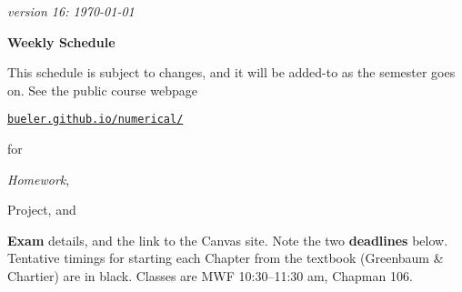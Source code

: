 \documentclass[12pt]{article}
\newcommand{\due}[1]{\strut {\color{BrickRed} \textsl{#1}}}
\newcommand{\proj}[1]{\strut {\color{RedOrange} #1}}
\newcommand{\ee}[1]{\strut {\color{Blue} \textbf{#1}}}
\newcommand{\dlinline}[1]{{\color{Purple} \textbf{#1}}}
\newcommand{\dl}[1]{{\small \dlinline{#1}}}
\begin{document}
\hfill \small \emph{version 16: \today} \normalsize

\bigskip\bigskip
\centerline{\Large \textbf{Weekly Schedule}}

\bigskip
This schedule is subject to changes, and it will be added-to as the semester goes on.  See the public course webpage

\medskip

\centerline{\href{https://bueler.github.io/numerical/index.html}{\texttt{bueler.github.io/numerical/}}}

\noindent for \due{Homework}, \proj{Project}, and \ee{Exam} details, and the link to the Canvas site.  Note the two \dl{deadlines} below.  Tentative timings for starting each Chapter from the textbook (Greenbaum \& Chartier) are in black.  Classes are MWF 10:30--11:30 am, Chapman 106.

\bigskip
\end{document}
